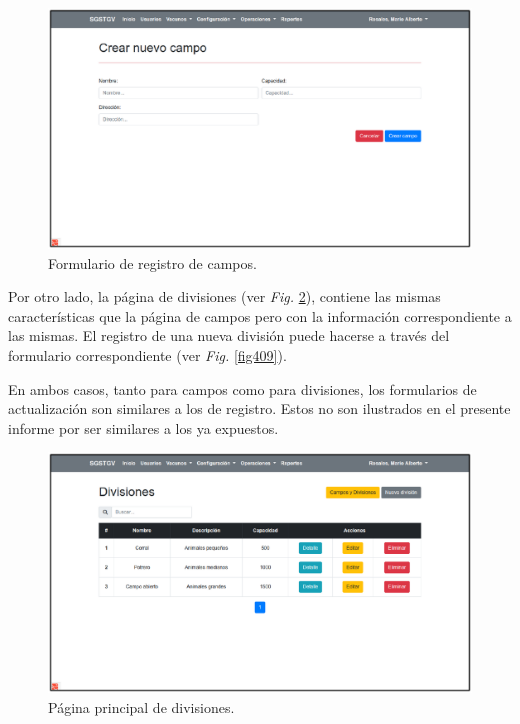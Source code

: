 \documentclass[11pt,oneside]{book}
\begin{document}
\begin{figure}[tbhp]
\centerline{\includegraphics[scale=0.87]{figs/capitulo_3_desarrollo/fig407.pdf}}
\caption{Formulario de registro de campos.}
\label{fig407}
\end{figure}

\newpage
Por otro lado, la página de divisiones (ver \textit{Fig.} \ref{fig408}), contiene las mismas características que la página de campos pero con la información correspondiente a las mismas. El registro de una nueva división puede hacerse a través del formulario correspondiente (ver \textit{Fig.} \ref{fig409}).

En ambos casos, tanto para campos como para divisiones, los formularios de actualización son similares a los de registro. Estos no son ilustrados en el presente informe por ser similares a los ya expuestos.

\begin{figure}[tbhp]
\centerline{\includegraphics[scale=0.87]{figs/capitulo_3_desarrollo/fig408.pdf}}
\caption{Página principal de divisiones.}
\label{fig408}
\end{figure}
\end{document}
